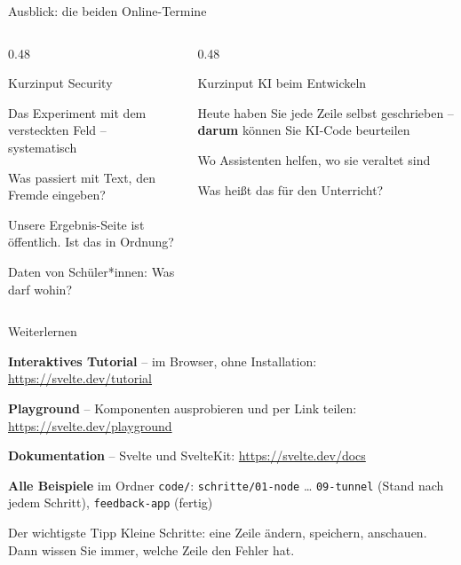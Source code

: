 \begin{frame}{Ausblick: die beiden Online-Termine}
  \begin{columns}[onlytextwidth,t]
    \begin{column}{0.48\textwidth}
      \begin{block}{Kurzinput Security}
        \footnotesize
        \begin{tugitemize}
          \item Das Experiment mit dem versteckten Feld -- systematisch
          \item Was passiert mit Text, den Fremde eingeben?
          \item Unsere Ergebnis-Seite ist öffentlich. Ist das in Ordnung?
          \item Daten von Schüler*innen: Was darf wohin?
        \end{tugitemize}
      \end{block}
    \end{column}
    \begin{column}{0.48\textwidth}
      \begin{block}{Kurzinput KI beim Entwickeln}
        \footnotesize
        \begin{tugitemize}
          \item Heute haben Sie jede Zeile selbst geschrieben -- \textbf{darum} können Sie KI-Code beurteilen
          \item Wo Assistenten helfen, wo sie veraltet sind
          \item Was heißt das für den Unterricht?
        \end{tugitemize}
      \end{block}
    \end{column}
  \end{columns}
\end{frame}

\begin{frame}{Weiterlernen}
  \footnotesize
  \begin{tugitemize}
    \item \textbf{Interaktives Tutorial} -- im Browser, ohne Installation:
          \url{https://svelte.dev/tutorial}
    \item \textbf{Playground} -- Komponenten ausprobieren und per Link teilen:
          \url{https://svelte.dev/playground}
    \item \textbf{Dokumentation} -- Svelte und SvelteKit:
          \url{https://svelte.dev/docs}
    \item \textbf{Alle Beispiele} im Ordner \texttt{code/}:
          \texttt{schritte/01-node} \dots{} \texttt{09-tunnel} (Stand nach jedem Schritt),
          \texttt{feedback-app} (fertig)
  \end{tugitemize}
  \begin{block}{Der wichtigste Tipp}
    Kleine Schritte: eine Zeile ändern, speichern, anschauen.
    Dann wissen Sie immer, welche Zeile den Fehler hat.
  \end{block}
\end{frame}

